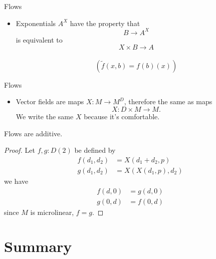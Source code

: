 \documentclass{beamer}
\begin{document}
\begin{frame}{Flows}
  \begin{itemize}
    \item Exponentials \( A^X \) have the property that
      \begin{equation*}
        B\to A^X 
      \end{equation*}
      is equivalent to
      \begin{equation*}
        X\times B \to A
      \end{equation*}\\
      \begin{equation*}
        \left( \tilde f(x,b) = f(b)(x) \right)
      \end{equation*}
  \end{itemize}
\end{frame}

\begin{frame}{Flows}
  \begin{itemize}
    \item Vector fields are maps \( X:M\to M^D \), therefore the same as maps
      \begin{equation*}
        X: D\times M \to M.
      \end{equation*}
      We write the same \( X \) because it's comfortable.
  \end{itemize}
\end{frame}

\begin{frame}
  \begin{proposition}
    Flows are additive.
  \end{proposition}
  \begin{proof}
    Let \( f,g:D(2) \) be defined by
    \begin{align*}
      f(d_1,d_2) &= X(d_1+d_2,p)\\
      g(d_1,d_2) &= X(X(d_1,p),d_2)
    \end{align*}
    we have
    \begin{align*}
      f(d,0) &= g(d,0)\\
      g(0,d) &= f(0,d)
    \end{align*}
    since \( M \) is microlinear, \( f=g \).
  \end{proof}
\end{frame}



\section*{Summary}
\end{document}
